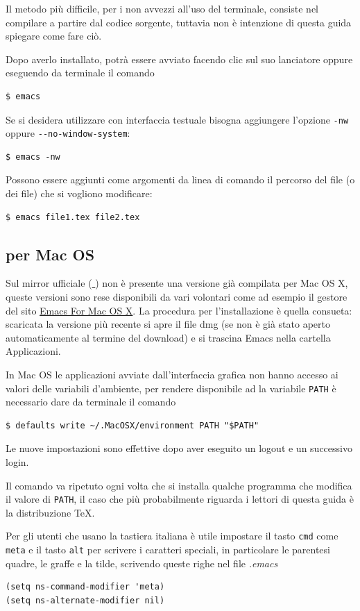 \documentclass[10pt,a4paper]{article}
\begin{document}
Il metodo più difficile, per i non avvezzi all'uso del terminale, consiste nel
compilare \emacs{} a partire dal codice sorgente, tuttavia non è intenzione di
questa guida spiegare come fare ciò.

Dopo averlo installato, \emacs{} potrà essere avviato facendo clic sul suo
lanciatore oppure eseguendo da terminale il comando
\begin{Verbatim}
$ emacs
\end{Verbatim}
Se si desidera utilizzare \emacs{} con interfaccia testuale bisogna aggiungere
l'opzione \verb|-nw| oppure \verb|--no-window-system|:
\begin{Verbatim}
$ emacs -nw
\end{Verbatim}
Possono essere aggiunti come argomenti da linea di comando il percorso del file
(o dei file) che si vogliono modificare:
\begin{Verbatim}
$ emacs file1.tex file2.tex
\end{Verbatim}

\subsection*{\emacs{} per Mac OS}
Sul mirror ufficiale
(\href{http://ftp.gnu.org/pub/gnu/emacs/windows/}{\mano{} \emacs}) non
è presente una versione già compilata per Mac OS X, queste versioni
sono rese disponibili da vari volontari come ad esempio il gestore del
sito \href{http://emacsformacosx.com/}{Emacs For Mac OS X}. La
procedura per l'installazione è quella consueta: scaricata la versione
più recente si apre il file dmg (se non è già stato aperto
automaticamente al termine del download) e si trascina Emacs nella
cartella Applicazioni.

In Mac OS le applicazioni avviate dall'interfaccia grafica non hanno
accesso ai valori delle variabili d'ambiente, per rendere disponibile
ad \emacs{} la variabile \texttt{PATH} è necessario dare da terminale
il comando
\begin{verbatim}
$ defaults write ~/.MacOSX/environment PATH "$PATH"
\end{verbatim}
Le nuove impostazioni sono effettive dopo aver eseguito un logout e un
successivo login.

Il comando va ripetuto ogni volta che si installa qualche programma
che modifica il valore di \texttt{PATH}, il caso che più probabilmente
riguarda i lettori di questa guida è la distribuzione \TeX{}.

Per gli utenti che usano la tastiera italiana è utile impostare il
tasto \texttt{cmd} come \texttt{meta} e il tasto \texttt{alt} per
scrivere i caratteri speciali, in particolare le parentesi quadre, le
graffe e la tilde, scrivendo queste righe nel file \emph{.emacs}
\begin{verbatim}
(setq ns-command-modifier 'meta)
(setq ns-alternate-modifier nil)
\end{verbatim}
\end{document}
